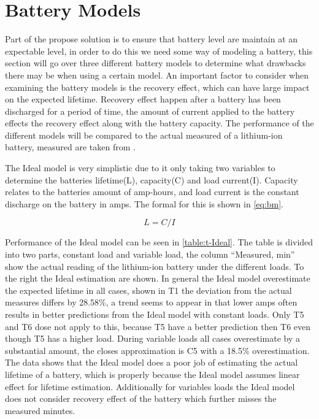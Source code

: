 \section{Battery Models}\label{sec:kibam}
Part of the propose solution is to ensure that battery level are maintain at an expectable level, in order to do this we need some way of modeling a battery, this section will go over three different battery models to determine what drawbacks there may be when using a certain model. An important factor to consider when examining the battery models is the recovery effect, which can have large impact on the expected lifetime. Recovery effect happen after a battery has been discharged for a period of time, the amount of current applied to the battery effects the recovery effect along with the battery capacity. The performance of the different models will be compared to the actual measured of a lithium-ion battery, measured are taken from \cite{battery_lifetime_analysis}.

The Ideal model is very simplistic due to it only taking two variables to determine the batteries lifetime(L), capacity(C) and load current(I). Capacity relates to the batteries amount of amp-hours, and load current is the constant discharge on the battery in amps. The formal for this is shown in \cref{eq:bm}.

\begin{equation}\label{eq:bm}
L=C/I
\end{equation}

Performance of the Ideal model can be seen in \cref{table:t-Ideal}. The table is divided into two parts, constant load and variable load, the column ``Measured, min'' show the actual reading of the lithium-ion battery under the different loads. To the right the Ideal estimation are shown. In general the Ideal model overestimate the expected lifetime in all cases, shown in T1 the deviation from the actual measures differs by 28.58\%, a trend seems to appear in that lower amps often results in better predictions from the Ideal model with constant loads. Only T5 and T6 dose not apply to this, because T5 have a better prediction then T6 even though T5 has a higher load. During variable loads all cases overestimate by a substantial amount, the closes approximation is C5 with a 18.5\% overestimation. The data shows that the Ideal model does a poor job of estimating the actual lifetime of a battery, which is properly because the Ideal model assumes linear effect for lifetime estimation. Additionally for variables loads the Ideal model does not consider recovery effect of the battery which further misses the measured minutes. 

